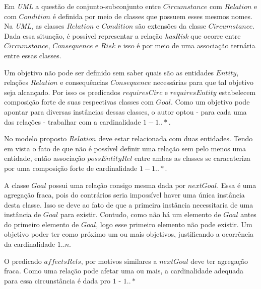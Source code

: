 Em \textit{UML} a questão de conjunto-subconjunto entre $Circumstance$ com $Relation$ e com $Condition$ é definida por meio de classes que possuem esses mesmos nomes. Na \textit{UML}, as classes $Relation$ e $Condition$ são extensões da classe $Circumstance$. Dada essa situação, é possível representar a relação \textit{hasRisk} que ocorre entre $Circumstance$, $Consequence$ e $Risk$ e isso é por meio de uma associação ternária entre essas classes. 

Um objetivo não pode ser definido sem saber quais são as entidades $Entity$, relações $Relation$ e consequências $Consequence$ necessárias para que tal objetivo seja alcançado. Por isso os predicados $requiresCirc$ e $requiresEntity$ estabelecem composição forte de suas respectivas classes com $Goal$. Como um objetivo pode apontar para diversas instâncias dessas classes, o autor optou - para cada uma das relações - trabalhar com a cardinalidade 
$1 - 1 .. *$.

No modelo proposto $Relation$ deve estar relacionada com duas entidades. Tendo em vista o fato de que não é possível definir uma relação sem pelo menos uma entidade, então associação $possEntityRel$ entre ambas as classes se caracateriza por uma composição forte de cardinalidade $1 - 1 .. *$. 

A classe $Goal$ possui uma relação consigo mesma dada por $nextGoal$. Essa é uma agregação fraca, pois do contrários seria impossível haver uma única instância desta classe. Isso se deve ao fato de que a primeira instância necessitaria de uma instância de $Goal$ para existir. Contudo, como não há um elemento de $Goal$ antes do primeiro elemento de $Goal$, logo esse primeiro elemento não pode existir. Um objetivo poder ter como próximo um ou mais objetivos, justificando a ocorrência da cardinalidade $1 .. n$. 

O predicado $affectsRels$, por motivos similares a $nextGoal$ deve ter agregação fraca. Como uma relação pode afetar uma ou mais, a cardinalidade adequada para essa circunstância é dada pro $1$ - $1 ..*$
